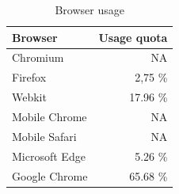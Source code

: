\documentclass[a4paper, 10pt]{article}
\begin{document}
\begin{table}[!ht]
  \centering
    \begin{tabular}{|l|r|}
      \hline
      \textbf{Browser}  & \textbf{Usage quota} \\ \hline
      Chromium          & NA \\ \hline
      Firefox           & 2,75 \% \\ \hline
      Webkit            & 17.96 \% \\ \hline
      Mobile Chrome     & NA \\ \hline
      Mobile Safari     & NA \\ \hline
      Microsoft Edge    & 5.26 \% \\ \hline
      Google Chrome     & 65.68 \% \\ \hline
    \end{tabular}
  \caption{Browser usage \citep{browserUsage}}
  \label{tab:browserUsage}
\end{table}
\end{document}
